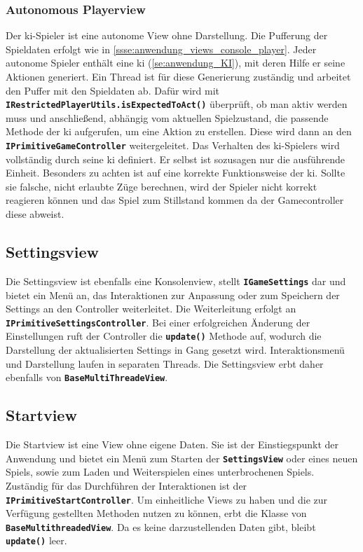 \documentclass[
							a4paper, 
							11pt, 
							openany, 
							liststotoc,
							parskip=half, 
   							headings=normal
						]{scrreprt}
\begin{document}
{\subsubsection{Autonomous Playerview} \label{ssse:anwendung_views_ai_player}
Der \acs{ki}-Spieler ist eine autonome View ohne Darstellung. Die Pufferung der Spieldaten erfolgt wie in \autoref{ssse:anwendung_views_console_player}. Jeder autonome Spieler enthält eine \acs{ki} (\autoref{se:anwendung_KI}), mit deren Hilfe er seine Aktionen generiert.\newline
Ein Thread ist für diese Generierung zuständig und arbeitet den Puffer mit den Spieldaten ab. Dafür wird mit \textbf{\texttt{IRes\-tric\-ted\-Pla\-yer\-Utils.\-is\-Ex\-pec\-ted\-To\-Act()}} überprüft, ob man aktiv werden muss und anschließend, abhängig vom aktuellen Spielzustand, die passende Methode der \acs{ki} aufgerufen, um eine Aktion zu erstellen. Diese wird dann an den \textbf{\texttt{IPrimitiveGameController}} weitergeleitet.\newline
Das Verhalten des \acs{ki}-Spielers wird vollständig durch seine \acs{ki} definiert. Er selbst ist sozusagen nur die ausführende Einheit. Besonders zu achten ist auf eine korrekte Funktionsweise der \acs{ki}. Sollte sie falsche, nicht erlaubte Züge berechnen, wird der Spieler nicht korrekt reagieren können und das Spiel zum Stillstand kommen da der Gamecontroller diese abweist.

\subsection{Settingsview} \label{sse:anwendung_views_settings}
Die Settingsview ist ebenfalls eine Konsolenview, stellt \textbf{\texttt{IGameSettings}} dar und bietet ein Menü an, das Interaktionen zur Anpassung oder zum Speichern der Settings an den Controller weiterleitet. Die Weiterleitung erfolgt an \textbf{\texttt{IPrimitiveSettingsController}}. 
Bei einer erfolgreichen Änderung der Einstellungen ruft der Controller die \textbf{\texttt{update()}} Methode auf, wodurch die Darstellung der aktualisierten Settings in Gang gesetzt wird.\newline
Interaktionsmenü und Darstellung laufen in separaten Threads. Die Settingsview erbt daher ebenfalls von \textbf{\texttt{BaseMultiThreadeView}}.

\subsection{Startview} \label{sse:anwendung_views_start}
Die Startview ist eine View ohne eigene Daten. Sie ist der Einstiegspunkt der Anwendung und bietet ein Menü zum Starten der \textbf{\texttt{SettingsView}} oder eines neuen Spiels, sowie zum Laden und Weiterspielen eines unterbrochenen Spiels. Zuständig für das Durchführen der Interaktionen ist der \textbf{\texttt{IPrimitiveStartController}}. Um einheitliche Views zu haben und die zur Verfügung gestellten Methoden nutzen zu können, erbt die Klasse von \textbf{\texttt{BaseMultithreadedView}}. Da es keine darzustellenden Daten gibt, bleibt \textbf{\texttt{update()}} leer.

}
\end{document}
